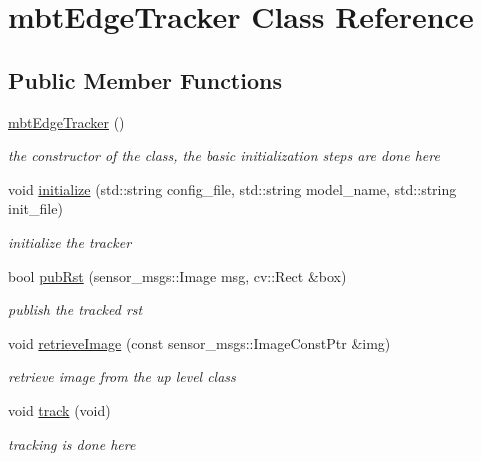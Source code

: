 \hypertarget{classmbtEdgeTracker}{\section{mbt\-Edge\-Tracker \-Class \-Reference}
\label{classmbtEdgeTracker}
}
\subsection*{\-Public \-Member \-Functions}
\begin{DoxyCompactItemize}
\item 
\hypertarget{classmbtEdgeTracker_a5ced2da03b4450be9261485b8396a818}{\hyperlink{classmbtEdgeTracker_a5ced2da03b4450be9261485b8396a818}{mbt\-Edge\-Tracker} ()}\label{classmbtEdgeTracker_a5ced2da03b4450be9261485b8396a818}

\begin{DoxyCompactList}\small\item\em the constructor of the class, the basic initialization steps are done here \end{DoxyCompactList}\item 
\hypertarget{classmbtEdgeTracker_a538786bf1ac308a4d5d093c4cac0d649}{void \hyperlink{classmbtEdgeTracker_a538786bf1ac308a4d5d093c4cac0d649}{initialize} (std\-::string config\-\_\-file, std\-::string model\-\_\-name, std\-::string init\-\_\-file)}\label{classmbtEdgeTracker_a538786bf1ac308a4d5d093c4cac0d649}

\begin{DoxyCompactList}\small\item\em initialize the tracker \end{DoxyCompactList}\item 
bool \hyperlink{classmbtEdgeTracker_a2f85c97bd271cae8e6e32daa4d78a8cd}{pub\-Rst} (sensor\-\_\-msgs\-::\-Image msg, cv\-::\-Rect \&box)
\begin{DoxyCompactList}\small\item\em publish the tracked rst \end{DoxyCompactList}\item 
void \hyperlink{classmbtEdgeTracker_aba2b7204bd1c0041eafbf94574aaa5a9}{retrieve\-Image} (const sensor\-\_\-msgs\-::\-Image\-Const\-Ptr \&img)
\begin{DoxyCompactList}\small\item\em retrieve image from the up level class \end{DoxyCompactList}\item 
\hypertarget{classmbtEdgeTracker_a15ee6f543ab6e8cd3b24dcc51ff69405}{void \hyperlink{classmbtEdgeTracker_a15ee6f543ab6e8cd3b24dcc51ff69405}{track} (void)}\label{classmbtEdgeTracker_a15ee6f543ab6e8cd3b24dcc51ff69405}

\begin{DoxyCompactList}\small\item\em tracking is done here \end{DoxyCompactList}\end{DoxyCompactItemize}


